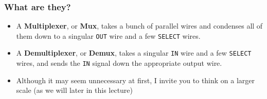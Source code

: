 \documentclass{beamer}
\begin{document}
    	\begin{frame}
    		\frametitle{What are they?}
    		\begin{itemize}
    			\item A \textbf{Multiplexer}, or \textbf{Mux}, takes a bunch of parallel wires and condenses all of them down to a singular \texttt{OUT} wire and a few \texttt{SELECT} wires.
    			\item A \textbf{Demultiplexer}, or \textbf{Demux}, takes a singular \texttt{IN} wire and a few \texttt{SELECT} wires, and sends the \texttt{IN} signal down the appropriate output wire.
    			\item Although it may seem unnecessary at first, I invite you to think on a larger scale (as we will later in this lecture)
    		\end{itemize}
    	\end{frame}
   
   		
    
\end{document}
